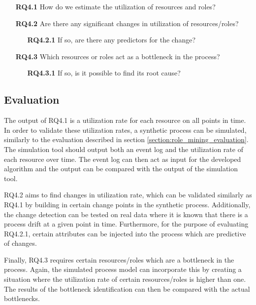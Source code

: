 \begin{enumerate}
\item[\textbf{RQ4.1}] How do we estimate the utilization of resources and roles?
\item[\textbf{RQ4.2}] Are there any significant changes in utilization of resources/roles?
  \begin{enumerate}
  \item[\textbf{RQ4.2.1}] If so, are there any predictors for the change? 
  \end{enumerate}
\item[\textbf{RQ4.3}] Which resources or roles act as a bottleneck in the process? 
  \begin{enumerate}
  \item[\textbf{RQ4.3.1}] If so, is it possible to find its root cause? 
  \end{enumerate}
\end{enumerate}

\subsection{Evaluation}
The output of RQ4.1 is a utilization rate for each resource on all points in time. In order to validate these utilization rates, a synthetic process can be simulated, similarly to the evaluation described in section \ref{section:role_mining_evaluation}. The simulation tool should output both an event log and the utilization rate of each resource over time. The event log can then act as input for the developed algorithm and the output can be compared with the output of the simulation tool. 

RQ4.2 aims to find changes in utilization rate, which can be validated similarly as RQ4.1 by building in certain change points in the synthetic process. Additionally, the change detection can be tested on real data where it is known that there is a process drift at a given point in time. Furthermore, for the purpose of evaluating RQ4.2.1, certain attributes can be injected into the process which are predictive of changes. 

Finally, RQ4.3 requires certain resources/roles which are a bottleneck in the process. Again, the simulated process model can incorporate this by creating a situation where the utilization rate of certain resources/roles is higher than one. The results of the bottleneck identification can then be compared with the actual bottlenecks. 

